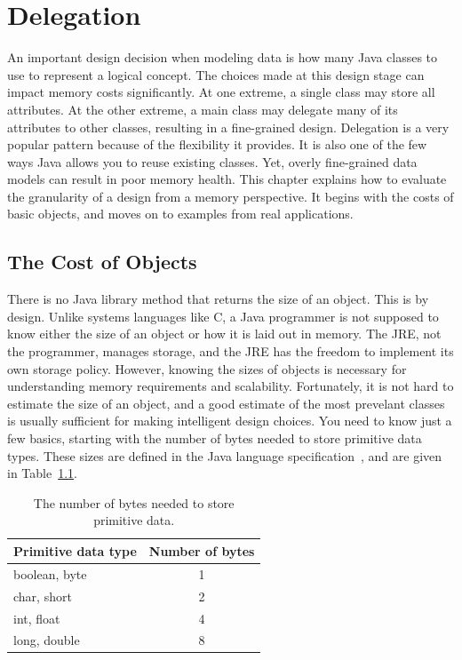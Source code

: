 \chapter{Delegation}

An important design decision when modeling data is how many Java classes to use to represent a logical concept. The choices made at this design stage can impact memory costs significantly. At one extreme, a single class may store all attributes. At the other extreme, a main class may delegate many of its attributes to other classes, resulting in a fine-grained design. Delegation is a very popular pattern because of the flexibility it provides. It is also one of the few ways Java allows you to reuse existing classes. Yet, overly fine-grained data models can result in poor memory health. This chapter explains how to evaluate the granularity of a design from a memory perspective. It begins with the costs of basic objects, and moves on to examples from real applications.
  
\section{The Cost of Objects}
\label{sec:CostOfObjects}

There is no Java library method that returns the size of an object. This is by design. Unlike systems languages like C, a Java programmer is not supposed to know either the size of an object or how it is laid out in memory. The JRE, not the programmer, manages storage, and the JRE has the freedom to implement its own storage policy. However, knowing the sizes of objects is necessary for understanding memory requirements and scalability. Fortunately, it is not hard to estimate the size of an object, and a good estimate of the most prevelant classes is usually sufficient for making intelligent design choices.  You need to know just a few basics, starting with the number of bytes needed to store primitive data types. These sizes are defined in the Java language specification~\cite{JavaSpec}, and are given in Table~\ref{tab:primitive-sizes}.
\begin{table}
  \centering
\begin{tabular}{lc} \toprule
	Primitive data type & Number of bytes \\ \midrule
	boolean, byte & 1 \\
	char, short & 2 \\
	int, float & 4 \\
	long, double & 8 \\
	\bottomrule
\end{tabular}
  \caption{The number of bytes needed to store primitive data.}
  \label{tab:primitive-sizes}
\end{table}

